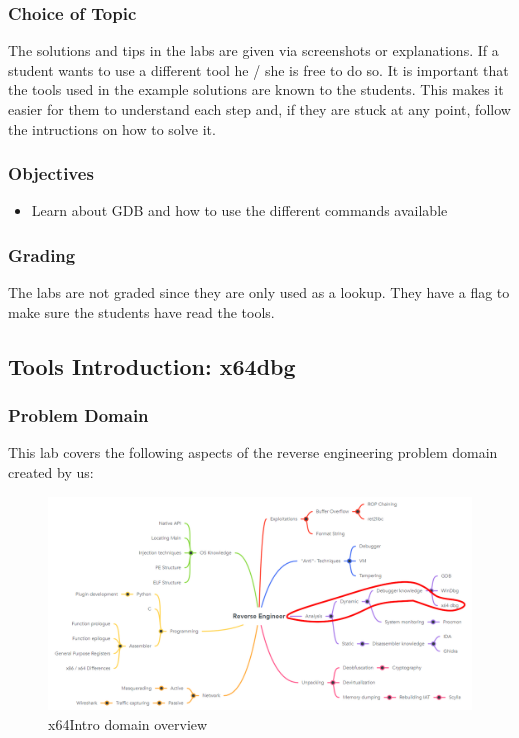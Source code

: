\subsubsection*{Choice of Topic}
The solutions and tips in the labs are given via screenshots or explanations. If a student wants to use a different tool he / she is free to do so. It is important that the tools used in the example solutions are known to the students. This makes it easier for them to understand each step and, if they are stuck at any point, follow the intructions on how to solve it. 
\subsubsection*{Objectives}
\begin{itemize}
    \item Learn about GDB and how to use the different commands available
\end{itemize}
\subsubsection*{Grading}
The labs are not graded since they are only used as a lookup. They have a flag to make sure the students have read the tools.
\pagebreak

\subsection{Tools Introduction: x64dbg}
\subsubsection*{Problem Domain}
This lab covers the following aspects of the reverse engineering problem domain created by us:
\vspace{-2ex}
\begin{figure}[H]
    \includegraphics[width=\textwidth]{resources/x64Intro-overview-light.png}
    \caption{x64Intro domain overview}
    \label{fig:x64Intro-overview}
\end{figure}
